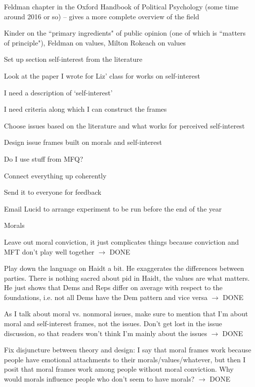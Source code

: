\begin{coi}
\begin{coi}
				\item Feldman chapter in the Oxford Handbook of Political Psychology (some time around 2016 or so) -- gives a more complete overview of the field
				\item Kinder on the ``primary ingredients" of public opinion (one of which is ``matters of principle"), Feldman on values, Milton Rokeach on values
			\end{coi}
		\item Set up section self-interest from the literature
			\begin{coi}
				\item Look at the paper I wrote for Liz' class for works on self-interest
				\item I need a description of `self-interest'
				\item I need criteria along which I can construct the frames
			\end{coi}
		\item Choose issues based on the literature and what works for perceived self-interest
		\item Design issue frames built on morals and self-interest
			\begin{coi}
				\item Do I use stuff from MFQ?
			\end{coi}
		\item Connect everything up coherently
		\item Send it to everyone for feedback
		\item Email Lucid to arrange experiment to be run before the end of the year
		\item Morals
			\begin{coi}
				\item Leave out moral conviction, it just complicates things because conviction and MFT don't play well together $\rightarrow$ DONE
				\item Play down the language on Haidt a bit. He exaggerates the differences between parties. There is nothing sacred about pid in Haidt, the values are what matters. He just shows that Dems and Reps differ on average with respect to the foundations, i.e. not all Dems have the Dem pattern and vice versa $\rightarrow$ DONE
				\item As I talk about moral vs. nonmoral issues, make sure to mention that I'm about moral and self-interest frames, not the issues. Don't get lost in the issue discussion, so that readers won't think I'm mainly about the issues $\rightarrow$ DONE
				\item Fix disjuncture between theory and design: I say that moral frames work because people have emotional attachments to their morals/values/whatever, but then I posit that moral frames work among people without moral conviction. Why would morals influence people who don't seem to have morals? $\rightarrow$ DONE

\end{coi}
\end{coi}
